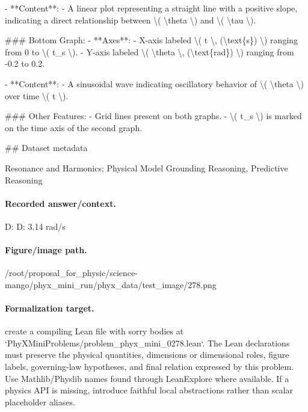 - **Content**: 
  - A linear plot representing a straight line with a positive slope, indicating a direct relationship between \textbackslash{}( \textbackslash{}theta \textbackslash{}) and \textbackslash{}( \textbackslash{}tau \textbackslash{}).

\#\#\# Bottom Graph:
- **Axes**: 
  - X-axis labeled \textbackslash{}( t \textbackslash{}, (\textbackslash{}text\{s\}) \textbackslash{}) ranging from 0 to \textbackslash{}( t\_s \textbackslash{}).
  - Y-axis labeled \textbackslash{}( \textbackslash{}theta \textbackslash{}, (\textbackslash{}text\{rad\}) \textbackslash{}) ranging from -0.2 to 0.2.
  
- **Content**:
  - A sinusoidal wave indicating oscillatory behavior of \textbackslash{}( \textbackslash{}theta \textbackslash{}) over time \textbackslash{}( t \textbackslash{}).

\#\#\# Other Features:
- Grid lines present on both graphs.
- \textbackslash{}( t\_s \textbackslash{}) is marked on the time axis of the second graph.

\#\# Dataset metadata

Resonance and Harmonics; Physical Model Grounding Reasoning, Predictive Reasoning

\paragraph{Recorded answer/context.}
D: D: 3.14 rad/s

\paragraph{Figure/image path.}
/root/proposal\_for\_physic/science-mango/phyx\_mini\_run/phyx\_data/test\_image/278.png

\paragraph{Formalization target.}
create a compiling Lean file with sorry bodies at `PhyXMiniProblems/problem\_phyx\_mini\_0278.lean`. The Lean declarations must preserve the physical quantities, dimensions or dimensional roles, figure labels, governing-law hypotheses, and final relation expressed by this problem.
Use Mathlib/Physlib names found through LeanExplore where available. If a physics API is missing, introduce faithful local abstractions rather than scalar placeholder aliases.

